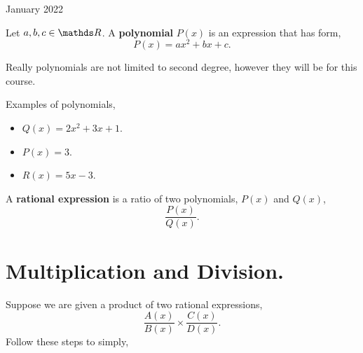 \documentclass[12pt,oneside]{book} %
\newcounter{step}[section]
\begin{document}
	\renewcommand*{\term}{Term 2} %
	\renewcommand*{\coursecode}{MCR3U} %
	\renewcommand*{\coursename}{Course Name} %
	\renewcommand*{\thelecnum}{7} %
	\renewcommand*{\profname}{Prof Name} %
	\renewcommand*{\colink}{http://www.student.math.uwaterloo.ca/~c2kent} %
	\clearpage
	\pagestyle{classlecture}
\begin{lec}{January 2022}

  \begin{defn}
      Let $a,b,c \in \R$. A \textbf{polynomial} $P(x)$ is an expression that has form,
        \[
            P(x) = ax^2 + bx + c
        .\] 
  \end{defn}

  \begin{rem}
      Really polynomials are not limited to second degree, however they will be for this course.
  \end{rem}

  \begin{ex}
    Examples of polynomials,
    \begin{itemize}
      \item $Q(x) = 2x^2 + 3x + 1$.
      \item $P(x) = 3$.
      \item $R(x) = 5x - 3$.
    \end{itemize}
  \end{ex}

  \begin{defn}
      A \textbf{rational expression} is a ratio of two polynomials, $P(x)$ and $Q(x)$, 
       \[
         \frac{P(x)}{Q(x)}
      .\] 
  \end{defn}

  \section{Multiplication and Division.}
  Suppose we are given a product of two rational expressions,
  \[
        \frac{A(x)}{B(x)} \times \frac{C(x)}{D(x)}
  .\] 
  Follow these steps to simply,


\end{lec}
\end{document}
